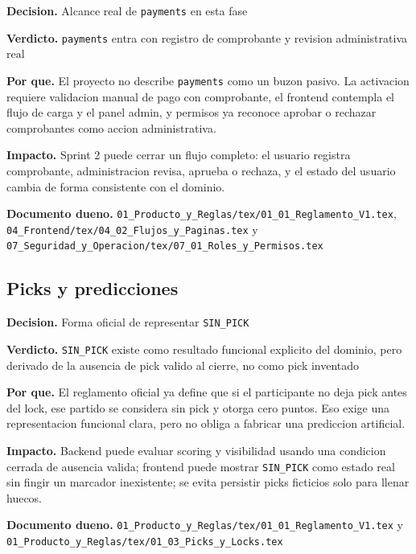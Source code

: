 \begin{docnote}
\textbf{Decision.} Alcance real de \texttt{payments} en esta fase

\textbf{Verdicto.} \texttt{payments} entra con registro de comprobante y revision administrativa real

\textbf{Por que.} El proyecto no describe \texttt{payments} como un buzon pasivo. La activacion requiere validacion manual de pago con comprobante, el frontend contempla el flujo de carga y el panel admin, y permisos ya reconoce aprobar o rechazar comprobantes como accion administrativa.

\textbf{Impacto.} Sprint 2 puede cerrar un flujo completo: el usuario registra comprobante, administracion revisa, aprueba o rechaza, y el estado del usuario cambia de forma consistente con el dominio.

\textbf{Documento dueno.} \texttt{01\_Producto\_y\_Reglas/tex/01\_01\_Reglamento\_V1.tex}, \texttt{04\_Frontend/tex/04\_02\_Flujos\_y\_Paginas.tex} y \texttt{07\_Seguridad\_y\_Operacion/tex/07\_01\_Roles\_y\_Permisos.tex}
\end{docnote}

\subsection{Picks y predicciones}

\begin{docnote}
\textbf{Decision.} Forma oficial de representar \texttt{SIN\_PICK}

\textbf{Verdicto.} \texttt{SIN\_PICK} existe como resultado funcional explicito del dominio, pero derivado de la ausencia de pick valido al cierre, no como pick inventado

\textbf{Por que.} El reglamento oficial ya define que si el participante no deja pick antes del lock, ese partido se considera sin pick y otorga cero puntos. Eso exige una representacion funcional clara, pero no obliga a fabricar una prediccion artificial.

\textbf{Impacto.} Backend puede evaluar scoring y visibilidad usando una condicion cerrada de ausencia valida; frontend puede mostrar \texttt{SIN\_PICK} como estado real sin fingir un marcador inexistente; se evita persistir picks ficticios solo para llenar huecos.

\textbf{Documento dueno.} \texttt{01\_Producto\_y\_Reglas/tex/01\_01\_Reglamento\_V1.tex} y \texttt{01\_Producto\_y\_Reglas/tex/01\_03\_Picks\_y\_Locks.tex}
\end{docnote}

